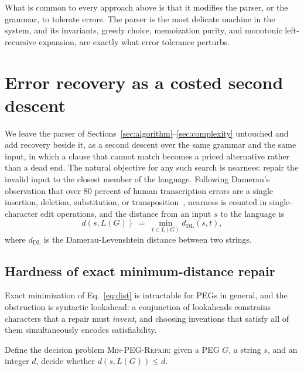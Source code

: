 \documentclass[manuscript]{acmart}
\begin{document}
What is common to every approach above is that it modifies the parser, or the grammar, to tolerate errors. The parser is the most delicate machine in the system, and its invariants, greedy choice, memoization purity, and monotonic left-recursive expansion, are exactly what error tolerance perturbs.

\section{Error recovery as a costed second descent}
\label{sec:repair}

We leave the parser of Sections~\ref{sec:algorithm}--\ref{sec:complexity} untouched and add recovery beside it, as a second descent over the same grammar and the same input, in which a clause that cannot match becomes a priced alternative rather than a dead end. The natural objective for any such search is nearness: repair the invalid input to the closest member of the language. Following Damerau's observation that over 80 percent of human transcription errors are a single insertion, deletion, substitution, or transposition~\cite{damerau1964,levenshtein1966}, nearness is counted in single-character edit operations, and the distance from an input $s$ to the language is
\begin{equation}
d(s, L(G)) \;=\; \min_{t \in L(G)} d_{\mathrm{DL}}(s, t),
\label{eq:dist}
\end{equation}
where $d_{\mathrm{DL}}$ is the Damerau-Levenshtein distance between two strings.

\subsection{Hardness of exact minimum-distance repair}
\label{sec:hardness}

Exact minimization of Eq.~\ref{eq:dist} is intractable for PEGs in general, and the obstruction is syntactic lookahead: a conjunction of lookaheads constrains characters that a repair must \emph{invent}, and choosing inventions that satisfy all of them simultaneously encodes satisfiability.

Define the decision problem \textsc{Min-PEG-Repair}: given a PEG $G$, a string $s$, and an integer $d$, decide whether $d(s, L(G)) \le d$.
\end{document}

